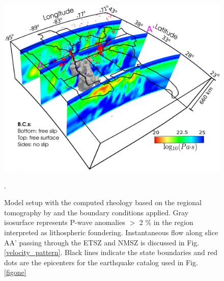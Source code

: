 \documentclass[draft,linenumbers]{agujournal2018}
\begin{document}
\begin{figure}[ht]
    \centering
    \includegraphics[width=0.75\linewidth]{figures/model_figure.png}
    \caption{Model setup with the computed rheology based on the regional tomography by \citet{Biryol_2016} and the boundary conditions applied. Gray isosurface represents P-wave anomalies $>$ 2 \% in the region interpreted as lithospheric foundering. Instantaneous flow along slice AA' passing through the ETSZ and NMSZ is discussed in Fig. \ref{velocity_pattern}. Black lines indicate the state boundaries and red dots are the epicenters for the earthquake catalog used in Fig. \ref{figone}}.
    \label{fig_model}
\end{figure}
\end{document}
